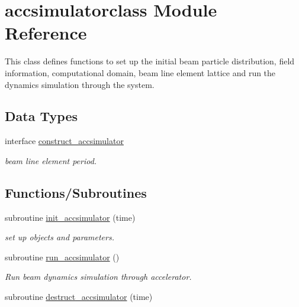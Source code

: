 \hypertarget{namespaceaccsimulatorclass}{}\section{accsimulatorclass Module Reference}
\label{namespaceaccsimulatorclass}


This class defines functions to set up the initial beam particle distribution, field information, computational domain, beam line element lattice and run the dynamics simulation through the system.  


\subsection*{Data Types}
\begin{DoxyCompactItemize}
\item 
interface \mbox{\hyperlink{interfaceaccsimulatorclass_1_1construct__accsimulator}{construct\+\_\+accsimulator}}
\begin{DoxyCompactList}\small\item\em beam line element period. \end{DoxyCompactList}\end{DoxyCompactItemize}
\subsection*{Functions/\+Subroutines}
\begin{DoxyCompactItemize}
\item 
subroutine \mbox{\hyperlink{namespaceaccsimulatorclass_a6a90186281758191cfa3ef4fc9c54078}{init\+\_\+accsimulator}} (time)
\begin{DoxyCompactList}\small\item\em set up objects and parameters. \end{DoxyCompactList}\item 
subroutine \mbox{\hyperlink{namespaceaccsimulatorclass_acbe26eeaf1cb4076384b90e1016785f0}{run\+\_\+accsimulator}} ()
\begin{DoxyCompactList}\small\item\em Run beam dynamics simulation through accelerator. \end{DoxyCompactList}\item 
subroutine \mbox{\hyperlink{namespaceaccsimulatorclass_a7bcc6275f447513b2ea5d85d46aade2a}{destruct\+\_\+accsimulator}} (time)
\end{DoxyCompactItemize}
